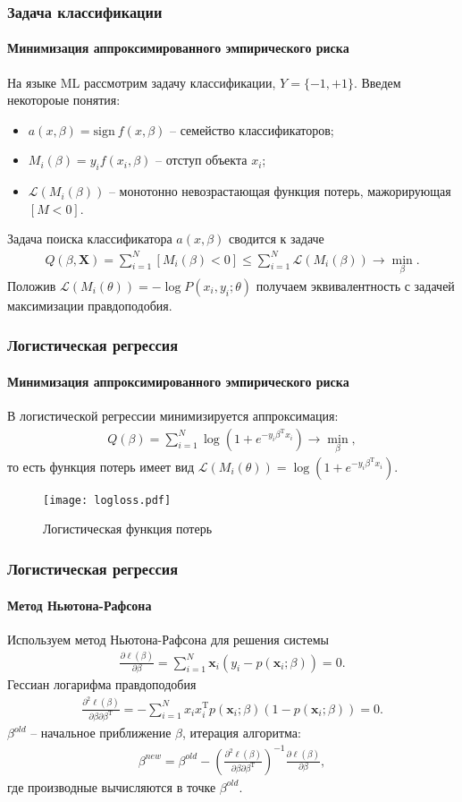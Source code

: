 \documentclass{beamer}
\begin{document}
\begin{frame}
  \frametitle{Задача классификации}
  \framesubtitle{Минимизация аппроксимированного эмпирического риска}
  На языке ML рассмотрим задачу классификации, $Y = \{-1, +1\}$. Введем некотороые понятия:
  \begin{itemize}
    \item $a(x, \beta) = \mathrm{sign}~f(x, \beta)$ -- семейство классификаторов;
    \item $M_i(\beta) = y_i f(x_i, \beta)$ -- отступ объекта $x_i$;
    \item $\mathcal{L}(M_i(\beta))$ -- монотонно невозрастающая функция потерь, мажорирующая $[M < 0]$.
  \end{itemize}
  \bigskip
Задача поиска классификатора $a(x, \beta)$ сводится к задаче
  \begin{align*}
    Q(\beta, \mathbf{X}) = \sum_{i = 1}^N [M_i(\beta) < 0] \leq \sum_{i = 1}^N \mathcal{L}(M_i(\beta)) \rightarrow \min_\beta.
  \end{align*}
  Положив $\mathcal{L}(M_i(\theta)) = -\log P(x_i, y_i; \theta)$ получаем эквивалентность с задачей максимизации правдоподобия.
\end{frame}
\begin{frame}
  \frametitle{Логистическая регрессия}
  \framesubtitle{Минимизация аппроксимированного эмпирического риска}
В логистической регрессии минимизируется аппроксимация:
  \begin{align*}
     Q(\beta) = \sum_{i = 1}^N \log(1 + e^{-y_i\beta^\mathrm{T}x_i}) \rightarrow \min_\beta,
  \end{align*}
то есть функция потерь имеет вид $\mathcal{L}(M_i(\theta)) = \log(1 + e^{-y_i\beta^\mathrm{T}x_i})$.

\begin{figure}
  \texttt{[image: logloss.pdf]}
  \caption{Логистическая функция потерь}
\end{figure}
\end{frame}
\begin{frame}
  \frametitle{Логистическая регрессия}
  \framesubtitle{Метод Ньютона-Рафсона}
Используем метод Ньютона-Рафсона для решения системы
  \begin{align*}
    \frac{\partial \ell(\beta)}{\partial \beta} = \sum_{i = 1}^N \mathbf{x}_i (y_i - p(\mathbf{x}_i; \beta)) = 0.
  \end{align*}
Гессиан логарифма правдоподобия
  \begin{align*}
    \frac{\partial^2 \ell(\beta)}{\partial \beta \partial \beta^{\mathrm{T}}} = -\sum_{i = 1}^N x_ix_i^\mathrm{T} p(\mathbf{x}_i; \beta)(1 - p(\mathbf{x}_i; \beta)) = 0.
  \end{align*}
$\beta^{old}$ -- начальное приближение $\beta$, итерация алгоритма:
  \begin{align*}
    \beta^{new} = \beta^{old} - \left(\frac{\partial^2 \ell(\beta)}{\partial \beta \partial \beta^{\mathrm{T}}}\right)^{-1}\frac{\partial \ell(\beta)}{\partial \beta},
  \end{align*}
  где производные вычисляются в точке $\beta^{old}$.
\end{frame}
\end{document}
